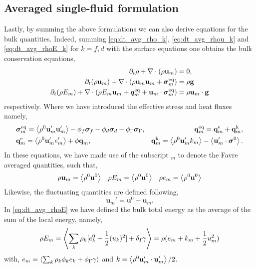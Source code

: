 \subsection{Averaged single-fluid formulation}
Lastly, by summing the above formulations we can also derive equations for the bulk quantities. 
Indeed, summing \ref{eq:dt_avg_rho_k}, \ref{eq:dt_avg_rhou_k} and \ref{eq:dt_avg_rhoE_k} for $k=f,d$ with the surface equations one obtains the bulk conservation equations, 
\begin{align}
    \label{eq:dt_avg_rho}
    \pddt \rho 
    + \div (
         \rho \textbf{u}_m
    )
    &= 
    0,\\
    \label{eq:dt_avg_rhou}
    \pddt ( \rho\textbf{u}_m)  
    + \div (
         \rho\textbf{u}_m\textbf{u}_m
        + \bm{\sigma}^\text{eq}_m
    )
    &= 
     \rho \textbf{g} \\
    \label{eq:dt_avg_rhoE}
    \pddt (\rho E_m)  
    + \div (
        \rho E_m \textbf{u}_m
        + \bm{q}^\text{eq}_m
        + \textbf{u}_m \cdot \bm{\sigma}^\text{eq}_m
        )
    &= 
     \rho \textbf{u}_m  \cdot \textbf{g} 
\end{align} 
respectively. 
Where we have introduced the effective stress and heat fluxes namely, 
\begin{align*}
    &\bm{\sigma}^\text{eq}_m
    = 
    \avg{ \rho^0\textbf{u}'_m\textbf{u}'_m}
      - \phi_f\bm\sigma_f
      - \phi_d\bm\sigma_d
      - \phi_\Gamma\bm\sigma_\Gamma,%
    &\textbf{q}^\text{eq}_m
    =\textbf{q}^\text{e}_m +\textbf{q}^\text{k}_m,  \\
    &\textbf{q}^\text{e}_m
    = \avg{\rho^0\textbf{u}_m' e_m'} 
    + \phi\textbf{q}_m,
    &\textbf{q}^\text{k}_m
    = \avg{\rho^0 \textbf{u}_m' k_m} 
    - \avg{ \textbf{u}_m' \cdot \bm{\sigma}^0}.
\end{align*}
In these equations, we have made use of the subscript $_m$ to denote the Favre averaged quantities, such that, 
\begin{align*}
    \rho \textbf{u}_m
    = \left<\rho^0 \textbf{u}^0\right>
    &&
    \rho E_m
    = \left<\rho^0 \textbf{u}^0\right>
    &&
    \rho e_m
    = \left<\rho^0 \textbf{u}^0\right>
\end{align*}
Likewise, the fluctuating quantities are defined following, 
\begin{equation}
    \textbf{u}_m'
    = \textbf{u}^0 - \textbf{u}_m.
\end{equation}
In \ref{eq:dt_avg_rhoE} we have defined the bulk total energy as the average of the sum of the local energy, namely, 
\begin{equation}
    \rho E_m = \left<\sum_k \rho_k [e_k^0 + \frac{1}{2}(u_k)^2] 
    + \delta_I \gamma\right>
    = \rho( e_m +  k_m + \frac{1}{2}u_m^2)
\end{equation}
with, $e_m = \left<\sum_k \rho_k\phi_k e_k + \phi_\Gamma \gamma\right>$ and $k = \left<\rho^0 \textbf{u}_m'\cdot \textbf{u}_m'\right>/2$. 

